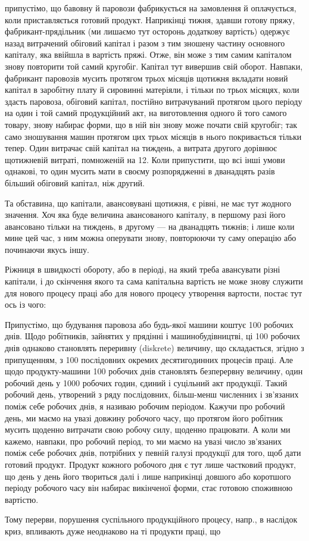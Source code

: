 \parcont{}  %
припустімо, що бавовну й паровози фабрикується на замовлення й оплачується,
коли приставляється готовий продукт. Наприкінці тижня, здавши
готову пряжу, фабрикант-прядільник (ми лишаємо тут осторонь додаткову
вартість) одержує назад витрачений обіговий капітал і разом з тим зношену
частину основного капіталу, яка ввійшла в вартість пряжі. Отже,
він може з тим самим капіталом знову повторити той самий кругобіг.
Капітал тут вивершив свій оборот. Навпаки, фабрикант паровозів мусить
протягом трьох місяців щотижня вкладати новий капітал в заробітну
плату й сировинні матеріяли, і тільки по трьох місяцях, коли здасть паровоза,
обіговий капітал, постійно витрачуваний протягом цього періоду
на один і той самий продукційний акт, на виготовлення одного й того
самого товару, знову набирає форми, що в ній він знову може почати
свій кругобіг; так само зношування машин протягом цих трьох місяців
в нього покривається тільки тепер. Один витрачає свій капітал на тиждень,
а витрата другого дорівнює щотижневій витраті, помноженій на 12.
Коли припустити, що всі інші умови однакові, то один мусить мати в
своєму розпорядженні в дванадцять разів більший обіговий капітал, ніж
другий.

Та обставина, що капітали, авансовувані щотижня, є рівні, не має
тут жодного значення. Хоч яка буде величина авансованого капіталу, в
першому разі його авансовано тільки на тиждень, в другому — на дванадцять
тижнів; і лише коли мине цей час, з ним можна оперувати
знову, повторюючи ту саму операцію або починаючи якусь іншу.

Ріжниця в швидкості обороту, або в періоді, на який треба авансувати
різні капітали, і до скінчення якого та сама капітальна вартість не
може знову служити для нового процесу праці або для нового процесу
утворення вартости, постає тут ось із чого:

Припустімо, що будування паровоза або будь-якої машини коштує
100 робочих днів. Щодо робітників, зайнятих у прядінні і машинобудівництві,
ці 100 робочих днів однаково становлять переривну (diskrete) величину,
що складається, згідно з припущенням, з 100 послідовних окремих
десятигодинних процесів праці. Але щодо продукту-машини 100
робочих днів становлять безперервну величину, один робочий день у
1000 робочих годин, єдиний і суцільний акт продукції. Такий робочий
день, утворений з ряду послідовних, більш-менш численних і зв’язаних
поміж себе робочих днів, я називаю робочим періодом. Кажучи
про робочий день, ми маємо на увазі довжину робочого часу, що протягом
його робітник мусить щоденно витрачати свою робочу силу, щоденно
працювати. А коли ми кажемо, навпаки, про робочий період, то
ми маємо на увазі число зв’язаних поміж себе робочих днів, потрібних
у певній галузі продукції для того, щоб дати готовий продукт. Продукт
кожного робочого дня є тут лише частковий продукт, що день у день
його твориться далі і лише наприкінці довшого або коротшого періоду робочого
часу він набирає викінченої форми, стає готовою споживною вартістю.

Тому перерви, порушення суспільного продукційного процесу, напр.,
в наслідок криз, впливають дуже неоднаково на ті продукти праці, що
\parbreak{}  %
